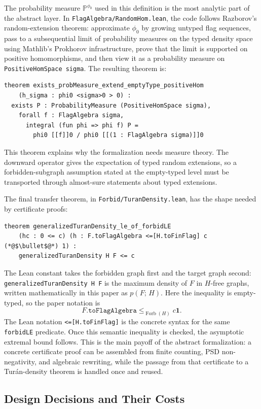 \documentclass{article}
\newcommand{\tdensity}[2]{p(#1;\,#2)}
\newcommand{\forbLE}[1]{\leq_{\operatorname{Forb}(#1)}}
\newcommand{\lean}[1]{\texttt{#1}}
\begin{document}
The probability measure $\mathbb{P}^{\phi_0}$ used in this definition is
the most analytic part of the abstract layer.  In
\lean{FlagAlgebra/RandomHom.lean}, the code follows Razborov's random-extension
theorem: approximate $\phi_0$ by growing untyped flag sequences, pass to a
subsequential limit of probability measures on the typed density space using
Mathlib's Prokhorov infrastructure, prove that the limit is supported on
positive homomorphisms, and then view it as a probability measure on
\lean{PositiveHomSpace sigma}.  The resulting theorem is:
\begin{lstlisting}
theorem exists_probMeasure_extend_emptyType_positiveHom
    (h_sigma : phi0 <sigma>0 > 0) :
  exists P : ProbabilityMeasure (PositiveHomSpace sigma),
    forall f : FlagAlgebra sigma,
      integral (fun phi => phi f) P =
        phi0 [[f]]0 / phi0 [[(1 : FlagAlgebra sigma)]]0
\end{lstlisting}
This theorem explains why the formalization needs measure theory.  The
downward operator gives the expectation of typed random extensions, so a
forbidden-subgraph assumption stated at the empty-typed level must be transported
through almost-sure statements about typed extensions.

The final transfer theorem, in \lean{Forbid/TuranDensity.lean}, has the shape
needed by certificate proofs:
\begin{lstlisting}
theorem generalizedTuranDensity_le_of_forbidLE
    (hc : 0 <= c) (h : F.toFlagAlgebra <=[H.toFinFlag] c (*@$\bullet$@*) 1) :
    generalizedTuranDensity H F <= c
\end{lstlisting}
The Lean constant takes the forbidden graph first and the target graph
second: \lean{generalizedTuranDensity H F} is the maximum density of $F$ in
$H$-free graphs, written mathematically in this paper as $\tdensity{F}{H}$.
Here the inequality is empty-typed, so the paper notation is
\[
  F.\lean{toFlagAlgebra} \forbLE{H} c\mathbf{1}.
\]
The Lean notation \lean{<=[H.toFinFlag]} is the concrete syntax for the same
\lean{forbidLE} predicate.  Once this semantic inequality is checked, the
asymptotic extremal bound follows.  This is the main payoff of the abstract
formalization: a concrete certificate proof can be assembled from finite
counting, PSD non-negativity, and algebraic rewriting, while the passage from
that certificate to a Turán-density theorem is handled once and reused.


\subsection{Design Decisions and Their Costs}
\label{sec:design-principles}
\end{document}
